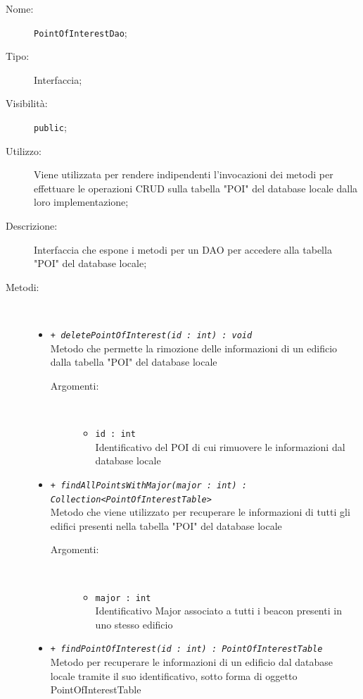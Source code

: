 \documentclass[../DefinizioneDiProdotto.tex]{subfiles}
\begin{document}
    \begin{description}
\item[Nome:] \texttt{PointOfInterestDao};
\item[Tipo:] Interfaccia;
\item[Visibilità:] \texttt{public};
\item[Utilizzo:] Viene utilizzata per rendere indipendenti l'invocazioni dei metodi per effettuare le operazioni CRUD sulla tabella "POI" del database locale dalla loro implementazione;
\item[Descrizione:] Interfaccia che espone i metodi per un DAO per accedere alla tabella "POI" del database locale;
\item[Metodi:] \
\begin{itemize}
\item \texttt{+ \textit{deletePointOfInterest(id : int) : void}}\\
Metodo che permette la rimozione delle informazioni di un edificio dalla tabella "POI" del database locale 
 \begin{description}
\item[Argomenti:] \
\begin{itemize}
\item \texttt{id : int}\\
Identificativo del POI di cui rimuovere le informazioni dal database locale\end{itemize}
\end{description}
\item \texttt{+ \textit{findAllPointsWithMajor(major : int) : Collection<PointOfInterestTable>}}\\
Metodo che viene utilizzato per recuperare le informazioni di tutti gli edifici presenti nella tabella "POI" del database locale
 \begin{description}
\item[Argomenti:] \
\begin{itemize}
\item \texttt{major : int}\\
Identificativo Major associato a tutti i beacon presenti in uno stesso edificio\end{itemize}
\end{description}
\item \texttt{+ \textit{findPointOfInterest(id : int) : PointOfInterestTable}}\\
Metodo per recuperare le informazioni di un edificio dal database locale tramite il suo identificativo, sotto forma di oggetto PointOfInterestTable

\end{itemize}
\end{description}
\end{document}
